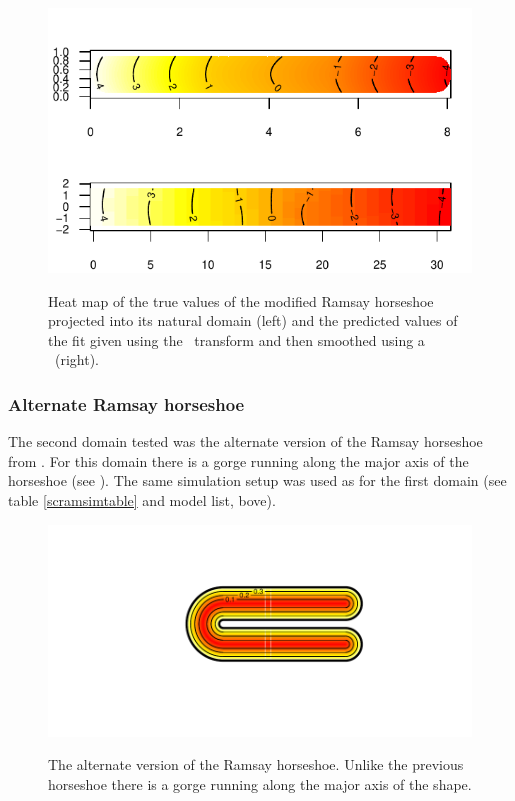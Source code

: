 \begin{figure}[t]
\centering
\includegraphics{sc/figs/hsvisgam.pdf} \\
\caption{Heat map of the true values of the modified Ramsay horseshoe projected into its natural domain (left) and the predicted values of the fit given using the \sch\ transform and then smoothed using a \tprs\ (right).}
\label{hsvisgam}
\end{figure}

\subsubsection{Alternate Ramsay horseshoe}
\label{sc-alt-horsehoe}

The second domain tested was the alternate version of the Ramsay horseshoe from . For this domain there is a gorge running along the major axis of the horseshoe (see ). The same simulation setup was used as for the first domain (see table \ref{scramsimtable} and model list, bove).

\begin{figure}[t]
\centering
\includegraphics[trim=0.5in 1in 0in 0.5in]{sc/figs/altramsayhorseshoe.pdf} \\
\caption{The alternate version of the Ramsay horseshoe. Unlike the previous horseshoe there is a gorge running along the major axis of the shape.}
\label{altramsayhorseshoe}
\end{figure}


